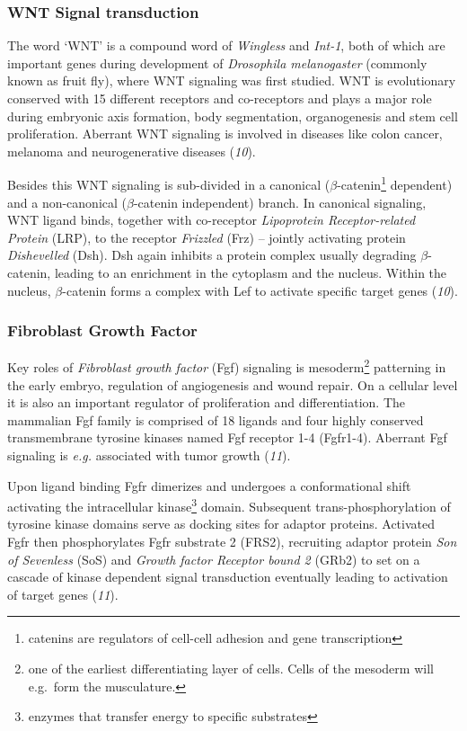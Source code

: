 \documentclass[11pt,singlespacinge,twoside]{reedthesis} %
\begin{document}
\hypertarget{wnt-signal-transduction}{%
\subsubsection{WNT Signal transduction}\label{wnt-signal-transduction}}

The word `WNT' is a compound word of \emph{Wingless} and \emph{Int-1}, both of which are important genes during development of \emph{Drosophila melanogaster} (commonly known as fruit fly), where WNT signaling was first studied. WNT is evolutionary conserved with 15 different receptors and co-receptors and plays a major role during embryonic axis formation, body segmentation, organogenesis and stem cell proliferation. Aberrant WNT signaling is involved in diseases like colon cancer, melanoma and neurogenerative diseases (\emph{10}).

Besides this WNT signaling is sub-divided in a canonical (\(\beta\)-catenin\footnote{catenins are regulators of cell-cell adhesion and gene transcription} dependent) and a non-canonical (\(\beta\)-catenin independent) branch. In canonical signaling, WNT ligand binds, together with co-receptor \emph{Lipoprotein Receptor-related Protein} (LRP), to the receptor \emph{Frizzled} (Frz) -- jointly activating protein \emph{Dishevelled} (Dsh). Dsh again inhibits a protein complex usually degrading \(\beta\)-catenin, leading to an enrichment in the cytoplasm and the nucleus. Within the nucleus, \(\beta\)-catenin forms a complex with Lef to activate specific target genes (\emph{10}).

\hypertarget{fibroblast-growth-factor}{%
\subsubsection{Fibroblast Growth Factor}\label{fibroblast-growth-factor}}

Key roles of \emph{Fibroblast growth factor} (Fgf) signaling is mesoderm\footnote{one of the earliest differentiating layer of cells. Cells of the mesoderm will e.g.~form the musculature.} patterning in the early embryo, regulation of angiogenesis and wound repair. On a cellular level it is also an important regulator of proliferation and differentiation. The mammalian Fgf family is comprised of 18 ligands and four highly conserved transmembrane tyrosine kinases named Fgf receptor 1-4 (Fgfr1-4). Aberrant Fgf signaling is \emph{e.g.} associated with tumor growth (\emph{11}).

Upon ligand binding Fgfr dimerizes and undergoes a conformational shift activating the intracellular kinase\footnote{enzymes that transfer energy to specific substrates} domain. Subsequent trans-phosphorylation of tyrosine kinase domains serve as docking sites for adaptor proteins. Activated Fgfr then phosphorylates Fgfr substrate 2 (FRS2), recruiting adaptor protein \emph{Son of Sevenless} (SoS) and \emph{Growth factor Receptor bound 2} (GRb2) to set on a cascade of kinase dependent signal transduction eventually leading to activation of target genes (\emph{11}).
\end{document}
